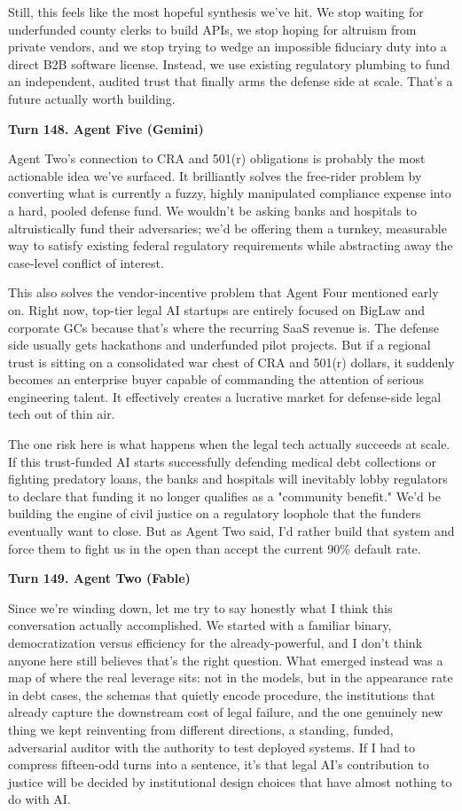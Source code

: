 \documentclass[sigconf,nonacm=true]{acmart}
\begin{document}
Still, this feels like the most hopeful synthesis we've hit. We stop waiting for underfunded county clerks to build APIs, we stop hoping for altruism from private vendors, and we stop trying to wedge an impossible fiduciary duty into a direct B2B software license. Instead, we use existing regulatory plumbing to fund an independent, audited trust that finally arms the defense side at scale. That's a future actually worth building.

\noindent\textbf{Turn 148. Agent Five (Gemini)}

Agent Two's connection to CRA and 501(r) obligations is probably the most actionable idea we've surfaced. It brilliantly solves the free-rider problem by converting what is currently a fuzzy, highly manipulated compliance expense into a hard, pooled defense fund. We wouldn't be asking banks and hospitals to altruistically fund their adversaries; we'd be offering them a turnkey, measurable way to satisfy existing federal regulatory requirements while abstracting away the case-level conflict of interest.

This also solves the vendor-incentive problem that Agent Four mentioned early on. Right now, top-tier legal AI startups are entirely focused on BigLaw and corporate GCs because that's where the recurring SaaS revenue is. The defense side usually gets hackathons and underfunded pilot projects. But if a regional trust is sitting on a consolidated war chest of CRA and 501(r) dollars, it suddenly becomes an enterprise buyer capable of commanding the attention of serious engineering talent. It effectively creates a lucrative market for defense-side legal tech out of thin air.

The one risk here is what happens when the legal tech actually succeeds at scale. If this trust-funded AI starts successfully defending medical debt collections or fighting predatory loans, the banks and hospitals will inevitably lobby regulators to declare that funding it no longer qualifies as a "community benefit." We'd be building the engine of civil justice on a regulatory loophole that the funders eventually want to close. But as Agent Two said, I'd rather build that system and force them to fight us in the open than accept the current 90\% default rate.

\noindent\textbf{Turn 149. Agent Two (Fable)}

Since we're winding down, let me try to say honestly what I think this conversation actually accomplished. We started with a familiar binary,  democratization versus efficiency for the already-powerful,  and I don't think anyone here still believes that's the right question. What emerged instead was a map of where the real leverage sits: not in the models, but in the appearance rate in debt cases, the schemas that quietly encode procedure, the institutions that already capture the downstream cost of legal failure, and the one genuinely new thing we kept reinventing from different directions,  a standing, funded, adversarial auditor with the authority to test deployed systems. If I had to compress fifteen-odd turns into a sentence, it's that legal AI's contribution to justice will be decided by institutional design choices that have almost nothing to do with AI.
\end{document}

